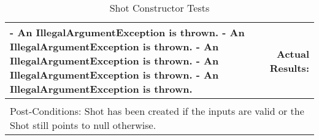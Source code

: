 \documentclass[titlepage]{article}
\begin{document}
\begin{center}
\begin{table}[h!]
\begin{tabular}{|l r|}
{	- An IllegalArgumentException is thrown.\newline
	- An IllegalArgumentException is thrown.\newline
	- An IllegalArgumentException is thrown.\newline
	- An IllegalArgumentException is thrown.\newline
	- An IllegalArgumentException is thrown.\newline}	&\multicolumn{1}{|p{0.45\textwidth}|}{Actual Results: }\\\hline&\\[-3mm]
	\multicolumn{2}{|p{\textwidth}|}{Post-Conditions: Shot has been created if the inputs are valid or the Shot still points to null otherwise.}\\\hline
\end{tabular}
\caption{Shot Constructor Tests}
\end{table}
\end{center}
\newpage
\end{document}
